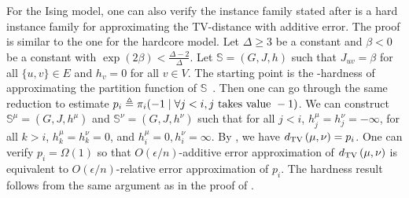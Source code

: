For the Ising model, one can also verify the instance family stated after  is a hard instance family for approximating the TV-distance with additive error. The proof is similar to the one for the hardcore model. 
Let $\Delta \geq 3$ be a constant and $\beta < 0$ be a constant with $\exp(2\beta) < \frac{\Delta-2}{\Delta}$.
Let $\mathbb{S} = (G,J,h)$ such that $J_{uv} = \beta$ for all $\{u,v\} \in E$ and $h_v = 0$ for all $v \in V$. 
The starting point is the -hardness of approximating the partition function of $\mathbb{S}$~\cite{SlyS12,GalanisSV16}. 
Then one can go through the same reduction to estimate $p_i \triangleq \pi_i(-1 \mid \forall j < i, j \text{ takes value } -1)$. We can construct $\mathbb{S}^\mu = (G,J,h^\mu)$ and $\mathbb{S}^\nu = (G,J,h^\nu)$ such that for all $j < i$, $h^\mu_j = h^\nu_j = -\infty$, for all $k > i$, $h^\mu_k = h^\nu_k = 0$, and $h^\mu_i = 0,h^\nu_i = \infty$. By , we have $d_{\mathrm{TV}}\left({\mu},{\nu}\right) = p_i$. One can verify $p_i = \Omega(1)$ so that $O(\epsilon/n)$-additive error approximation of $d_{\mathrm{TV}}\left({\mu},{\nu}\right)$ is equivalent to $O(\epsilon/n)$-relative error approximation of $p_i$. The hardness result follows from the same argument as in the proof of .



